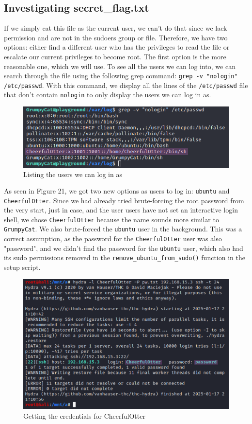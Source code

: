 \documentclass[a4paper]{article}
\newcommand{\abc}{\hfill \break}
\begin{document}
\subsection{Investigating secret\_flag.txt}
If we simply cat this file as the current user, we can't do that since we lack permission and are not in the sudoers group or file. Therefore, we have two options: either find a different user who has the privileges to read the file or escalate our current privileges to become root. The first option is the more reasonable one, which we will use.
To see all the users we can log into, we can search through the file using the following grep command: \texttt{grep -v "nologin" /etc/passwd}. With this command, we display all the lines of the \texttt{/etc/passwd} file that don't contain \texttt{nologin} to only display the users we can log in as.
\begin{figure}[ht]
	\includegraphics[scale=0.45]{images/usr.png}
	\centering
	\caption{Listing the users we can log in as}
\end{figure}\abc
As seen in Figure 21, we got two new options as users to log in: \texttt{ubuntu} and \texttt{CheerfulOtter}. Since we had already tried brute-forcing the root password from the very start, just in case, and the user users have not set an interactive login shell, we chose \texttt{CheerfulOtter} because the name sounds more similar to \texttt{GrumpyCat}. We also brute-forced the \texttt{ubuntu} user in the background. This was a correct assumption, as the password for the \texttt{CheerfulOtter} user was also "password", and we didn't find the password for the \texttt{ubuntu} user, which also had its sudo permissions removed in the \texttt{remove\_ubuntu\_from\_sudo()} function in the setup script.
\begin{figure}[h]
	\includegraphics[scale=0.45]{images/cheerfulotpw.png}
	\centering
	\caption{Getting the credentials for CheerfulOtter}
\end{figure}\abc
\end{document}

